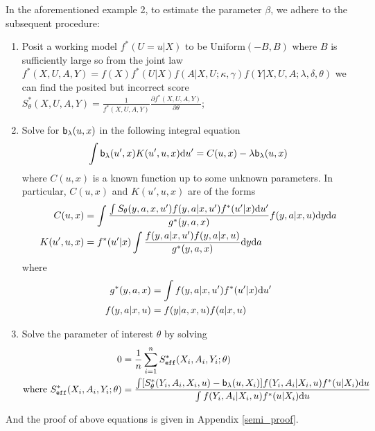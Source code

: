 \documentclass[11pt]{article}
\def\eff{\texttt{eff}}
\begin{document}
\begin{example1}[continued]
In the aforementioned example 2, to estimate the parameter $\beta$, we adhere to the subsequent procedure:
\begin{enumerate}
\item Posit a working model $f^{\ast} (U = u | X)$ to be $\text{Uniform} (-B, B)$ where $B$ is sufficiently large so from the joint law $f^{\ast} (X, U, A, Y) = f (X) f^{\ast} (U | X) f (A | X, U; \kappa, \gamma) f (Y | X, U, A; \lambda, \delta, \theta)$ we can find the posited but incorrect score $S_{\theta}^{\ast} (X, U, A, Y) = \frac{1}{f^{\ast} (X, U, A, Y)} \frac{\partial f^{\ast} (X, U, A, Y)}{\partial \theta}$;
\item Solve for ${\mathsf{b}}_{\lambda} (u, x)$ in the following integral equation
\begin{equation}
\label{fred-sensitivity}
\int {\mathsf{b}}_{\lambda} (u', x) K (u', u, x) \mathrm{d} u' = C (u, x) - \lambda {\mathsf{b}}_{\lambda} (u, x)
\end{equation}
where $C (u, x)$ is a known function up to some unknown parameters. In particular, $C (u, x)$ and $K (u', u, x)$ are of the forms
\begin{equation}
\begin{split}
C (u, x) & = \int \frac{\int S_{\theta} (y, a, x, u') f (y, a | x, u') f^{\ast} (u' | x) \mathrm{d} u'}{g^{\ast} (y, a, x)} f (y, a | x, u) \mathrm{d} y \mathrm{d} a \\
K (u', u, x) & = f^{\ast} (u' | x) \int \frac{f (y, a | x, u') f (y, a | x, u)}{g^{\ast} (y, a, x)} \mathrm{d} y \mathrm{d} a
\end{split}
\end{equation}
where
\begin{equation}
\begin{split}
g^{\ast} (y, a, x) & = \int f (y, a | x, u') f^{\ast} (u' | x) \mathrm{d} u' \\
f (y, a | x, u) & = f (y | a, x, u) f (a | x, u)
\end{split}
\end{equation}
\item Solve the parameter of interest $\theta$ by solving
\begin{equation}
\label{score-sensitivity}
\begin{split}
0 & = \frac{1}{n} \sum_{i = 1}^{n} S_{\eff}^{\ast} (X_{i}, A_{i}, Y_{i}; \theta) \\
\text{where } S_{\eff}^{\ast} (X_{i}, A_{i}, Y_{i}; \theta) & = \frac{\int [S_{\theta}^{\ast} (Y_{i}, A_{i}, X_{i}, u) - \sfb _{\lambda} (u, X_{i})] f (Y_{i}, A_{i} | X_{i}, u) f^{\ast} (u | X_{i}) \diff u}{\int f (Y_{i}, A_{i} | X_{i}, u) f^{\ast} (u | X_{i}) \diff u}
\end{split}
\end{equation}
\end{enumerate}

And the proof of above equations is given in Appendix \ref{semi_proof}.
\end{example1}
\end{document}
